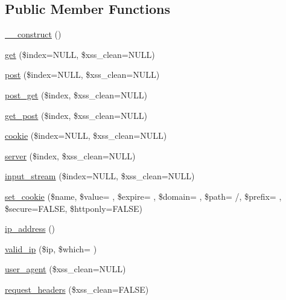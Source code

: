 \subsection*{Public Member Functions}
\begin{DoxyCompactItemize}
\item 
\hyperlink{class_c_i___input_a095c5d389db211932136b53f25f39685}{\+\_\+\+\_\+construct} ()
\item 
\hyperlink{class_c_i___input_a970536cd64a3d4457502140cce03fb05}{get} (\$index=N\+U\+L\+L, \$xss\+\_\+clean=N\+U\+L\+L)
\item 
\hyperlink{class_c_i___input_abe57ddea9c16f0d9194c82c700c0416f}{post} (\$index=N\+U\+L\+L, \$xss\+\_\+clean=N\+U\+L\+L)
\item 
\hyperlink{class_c_i___input_a3c554376c4a437c5363a143d1ca88ecc}{post\+\_\+get} (\$index, \$xss\+\_\+clean=N\+U\+L\+L)
\item 
\hyperlink{class_c_i___input_aaf7eba2dc5fda4e14ae063f66236821f}{get\+\_\+post} (\$index, \$xss\+\_\+clean=N\+U\+L\+L)
\item 
\hyperlink{class_c_i___input_a473ce915ac81faa466ca351dacae799d}{cookie} (\$index=N\+U\+L\+L, \$xss\+\_\+clean=N\+U\+L\+L)
\item 
\hyperlink{class_c_i___input_aab98211ca0db00061e8eb8b928f4fd90}{server} (\$index, \$xss\+\_\+clean=N\+U\+L\+L)
\item 
\hyperlink{class_c_i___input_a55235beafbbc257c5e511435a4d9ec81}{input\+\_\+stream} (\$index=N\+U\+L\+L, \$xss\+\_\+clean=N\+U\+L\+L)
\item 
\hyperlink{class_c_i___input_a8c67f0f01ebdd754f0447ae025d29b81}{set\+\_\+cookie} (\$name, \$value= \textquotesingle{}\textquotesingle{}, \$expire= \textquotesingle{}\textquotesingle{}, \$domain= \textquotesingle{}\textquotesingle{}, \$path= \textquotesingle{}/\textquotesingle{}, \$prefix= \textquotesingle{}\textquotesingle{}, \$secure=F\+A\+L\+S\+E, \$httponly=F\+A\+L\+S\+E)
\item 
\hyperlink{class_c_i___input_aec2f772317b4fb79cc696412c2e455c3}{ip\+\_\+address} ()
\item 
\hyperlink{class_c_i___input_a2adf8f23c98fcdafdc7588f874db4c4d}{valid\+\_\+ip} (\$ip, \$which= \textquotesingle{}\textquotesingle{})
\item 
\hyperlink{class_c_i___input_a4374172b6440fd600f78ff8efc0906c9}{user\+\_\+agent} (\$xss\+\_\+clean=N\+U\+L\+L)
\item 
\hyperlink{class_c_i___input_a4bc8f8c9a9488ff359a61f1fb60e6097}{request\+\_\+headers} (\$xss\+\_\+clean=F\+A\+L\+S\+E)

\end{DoxyCompactItemize}
